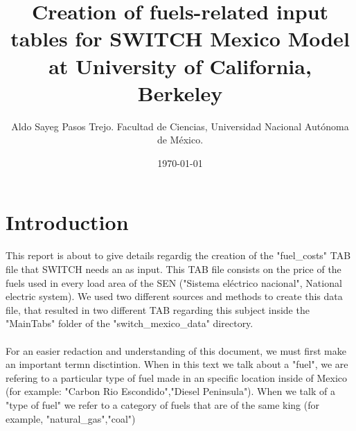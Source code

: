 \documentclass{article}
\author{Aldo Sayeg Pasos Trejo. Facultad de Ciencias, Universidad Nacional Autónoma de México.}
\date{\today}
\title{Creation of fuels-related input tables for SWITCH Mexico Model at University of California, Berkeley}
\begin{document}
\maketitle
\section{Introduction}
This report is about to give details regardig the creation of the "fuel\_costs" TAB file that SWITCH needs an as input. This TAB file consists on the price of the fuels used in every load area of the SEN ("Sistema eléctrico nacional", National electric system). We used two different sources and methods to create this data file, that resulted in two different TAB regarding this subject inside the "MainTabs" folder of the "switch\_mexico\_data" directory.
\\
\\For an easier redaction and understanding  of this document, we must first make an important termn disctintion. When in this text we talk about a "fuel", we are refering to a particular type of fuel made in an specific location inside of Mexico (for example: "Carbon Rio Escondido","Diesel Peninsula"). When we talk of a "type of fuel" we refer to a category of fuels that are of the same king (for example, "natural\_gas","coal")
\end{document}
